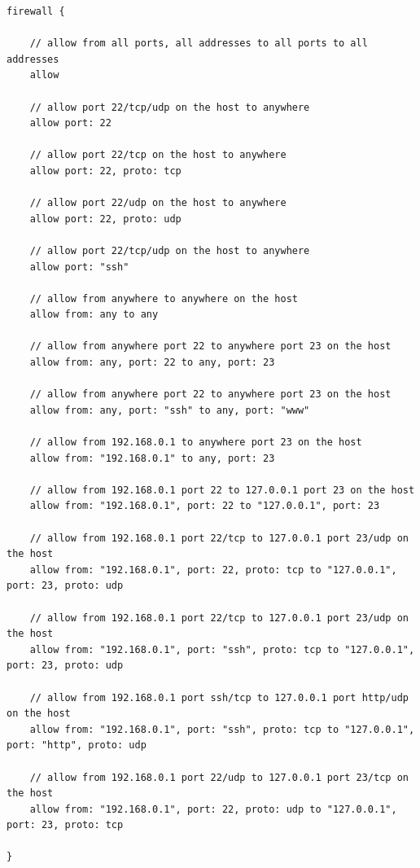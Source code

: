 \begin{lstlisting}[style=Java,label=lst:firewall_allow_script,caption=Firewall Allow Rules Script]
firewall {

    // allow from all ports, all addresses to all ports to all addresses
    allow

    // allow port 22/tcp/udp on the host to anywhere
    allow port: 22

    // allow port 22/tcp on the host to anywhere
    allow port: 22, proto: tcp

    // allow port 22/udp on the host to anywhere
    allow port: 22, proto: udp

    // allow port 22/tcp/udp on the host to anywhere
    allow port: "ssh"

    // allow from anywhere to anywhere on the host
    allow from: any to any

    // allow from anywhere port 22 to anywhere port 23 on the host
    allow from: any, port: 22 to any, port: 23

    // allow from anywhere port 22 to anywhere port 23 on the host
    allow from: any, port: "ssh" to any, port: "www"

    // allow from 192.168.0.1 to anywhere port 23 on the host
    allow from: "192.168.0.1" to any, port: 23

    // allow from 192.168.0.1 port 22 to 127.0.0.1 port 23 on the host
    allow from: "192.168.0.1", port: 22 to "127.0.0.1", port: 23

    // allow from 192.168.0.1 port 22/tcp to 127.0.0.1 port 23/udp on the host
    allow from: "192.168.0.1", port: 22, proto: tcp to "127.0.0.1", port: 23, proto: udp

    // allow from 192.168.0.1 port 22/tcp to 127.0.0.1 port 23/udp on the host
    allow from: "192.168.0.1", port: "ssh", proto: tcp to "127.0.0.1", port: 23, proto: udp

    // allow from 192.168.0.1 port ssh/tcp to 127.0.0.1 port http/udp on the host
    allow from: "192.168.0.1", port: "ssh", proto: tcp to "127.0.0.1", port: "http", proto: udp

    // allow from 192.168.0.1 port 22/udp to 127.0.0.1 port 23/tcp on the host
    allow from: "192.168.0.1", port: 22, proto: udp to "127.0.0.1", port: 23, proto: tcp

}
\end{lstlisting}

\pagebreak

